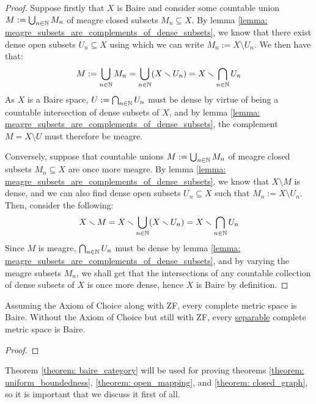             \begin{proof}
                Suppose firstly that $X$ is Baire and consider some countable union $M := \bigcup_{n \in \mathbb{N}} M_n$ of meagre closed subsets $M_n \subseteq X$. By lemma \ref{lemma: meagre_subsets_are_complements_of_dense_subsets}, we know that there exist dense open subsets $U_n \subseteq X$ using which we can write $M_n := X \setminus U_n$. We then have that:
                    $$M := \bigcup_{n \in \mathbb{N}} M_n = \bigcup_{n \in \mathbb{N}} (X \smallsetminus U_n) = X \smallsetminus \bigcap_{n \in \mathbb{N}} U_n$$
                As $X$ is a Baire space, $U := \bigcap_{n \in \mathbb{N}} U_n$ must be dense by virtue of being a countable intersection of dense subsets of $X$, and by lemma \ref{lemma: meagre_subsets_are_complements_of_dense_subsets}, the complement $M = X \setminus U$ must therefore be meagre.

                Conversely, suppose that countable unions $M := \bigcup_{n \in \mathbb{N}} M_n$ of meagre closed subsets $M_n \subseteq X$ are once more meagre. By lemma \ref{lemma: meagre_subsets_are_complements_of_dense_subsets}, we know that $X \setminus M$ is dense, and we can also find dense open subsets $U_n \subseteq X$ such that $M_n := X \setminus U_n$. Then, consider the following:
                    $$X \smallsetminus M = X \smallsetminus \bigcup_{n \in \mathbb{N}} (X \smallsetminus U_n) = X \smallsetminus \bigcap_{n \in \mathbb{N}} U_n$$
                Since $M$ is meagre, $\bigcap_{n \in \mathbb{N}} U_n$ must be dense by lemma \ref{lemma: meagre_subsets_are_complements_of_dense_subsets}, and by varying the meagre subsets $M_n$, we shall get that the intersections of any countable collection of dense subsets of $X$ is once more dense, hence $X$ is Baire by definition.
            \end{proof}
        \begin{theorem} \label{theorem: baire_category}
            Assuming the Axiom of Choice along with ZF, every complete metric space is Baire. Without the Axiom of Choice but still with ZF, every \underline{separable} complete metric space is Baire.
        \end{theorem}
            \begin{proof}
                
            \end{proof}
        \begin{remark}
            Theorem \ref{theorem: baire_category} will be used for proving theorems \ref{theorem: uniform_boundedness}, \ref{theorem: open_mapping}, and \ref{theorem: closed_graph}, so it is important that we discuss it first of all.
        \end{remark}

